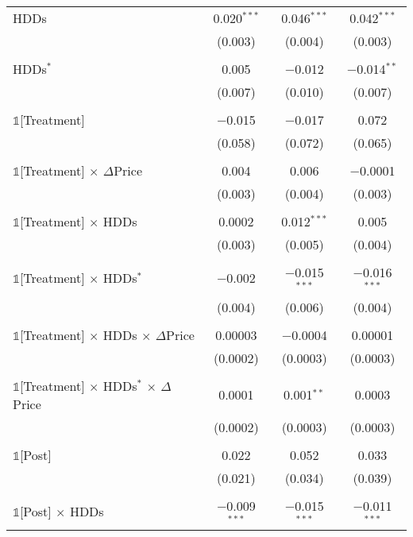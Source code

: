 {\begin{table}[t!]
\begin{ThreePartTable}
\begin{longtable}{@{\extracolsep{40pt}}lccc}
                HDDs & 0.020$^{***}$ & 0.046$^{***}$ & 0.042$^{***}$ \\
                & (0.003) & (0.004) & (0.003) \\
                & & & \\
                HDDs$^{*}$ & 0.005 & $-$0.012 & $-$0.014$^{**}$ \\
                & (0.007) & (0.010) & (0.007) \\
                & & & \\
                $\mathbb{1}$[Treatment] & $-$0.015 & $-$0.017 & 0.072 \\
                & (0.058) & (0.072) & (0.065) \\
                & & & \\
                $\mathbb{1}$[Treatment] $\times$ $\Delta$Price & 0.004 & 0.006 & $-$0.0001 \\
                & (0.003) & (0.004) & (0.003) \\
                & & & \\
                $\mathbb{1}$[Treatment] $\times$ HDDs & 0.0002 & 0.012$^{***}$ & 0.005 \\
                & (0.003) & (0.005) & (0.004) \\
                & & & \\
                $\mathbb{1}$[Treatment] $\times$ HDDs$^{*}$ & $-$0.002 & $-$0.015$^{***}$ & $-$0.016$^{***}$ \\
                & (0.004) & (0.006) & (0.004) \\
                & & & \\
                $\mathbb{1}$[Treatment] $\times$ HDDs $\times$ $\Delta$Price & 0.00003 & $-$0.0004 & 0.00001 \\
                & (0.0002) & (0.0003) & (0.0003) \\
                & & & \\
                $\mathbb{1}$[Treatment] $\times$ HDDs$^{*}$ $\times$ $\Delta$Price & 0.0001 & 0.001$^{**}$ & 0.0003 \\
                & (0.0002) & (0.0003) & (0.0003) \\
                & & & \\
                $\mathbb{1}$[Post] & 0.022 & 0.052 & 0.033 \\
                & (0.021) & (0.034) & (0.039) \\
                & & & \\
                $\mathbb{1}$[Post] $\times$ HDDs & $-$0.009$^{***}$ & $-$0.015$^{***}$ & $-$0.011$^{***}$ \\

\end{longtable}
\end{ThreePartTable}
\end{table}}

